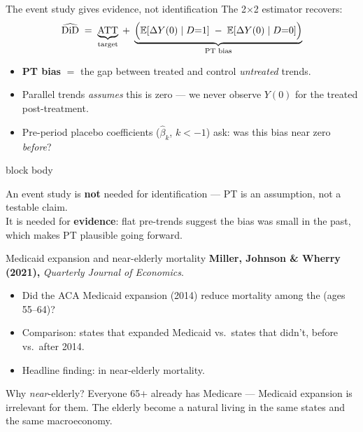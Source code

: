 \documentclass[aspectratio=169,11pt]{beamer}
\newcommand{\emphbox}[1]{%
  \begin{beamercolorbox}[rounded=true,sep=7pt,wd=\linewidth]{block body}%
    \small\color{slate}\raggedright #1%
  \end{beamercolorbox}}
\begin{document}
\begin{frame}{The event study gives evidence, not identification}
\vspace{0.2em}
The 2$\times$2 estimator recovers:
\[
\widehat{\text{DiD}} \;=\; \underbrace{\text{ATT}}_{\text{target}} \;+\;
\underbrace{\Bigl(\mathbb{E}[\Delta Y(0) \mid D{=}1] \;-\; \mathbb{E}[\Delta Y(0) \mid D{=}0]\Bigr)}_{\text{PT bias}}
\]
\vspace{0.1em}
\begin{itemize}\setlength\itemsep{3pt}\small
  \item \textbf{PT bias} $=$ the gap between treated and control \textit{untreated} trends.
  \item Parallel trends \textit{assumes} this is zero --- we never observe $Y(0)$ for the treated post-treatment.
  \item Pre-period placebo coefficients ($\hat\beta_k$, $k < -1$) ask: was this bias near zero \textit{before}?
\end{itemize}
\vspace{0.3em}
\emphbox{An event study is \textbf{not} needed for identification --- PT is an assumption, not a testable claim. \\[4pt]
It is needed for \textbf{evidence}: flat pre-trends suggest the bias was small in the past, which makes PT plausible going forward.}
\end{frame}

\begin{frame}{Medicaid expansion and near-elderly mortality}
\vspace{0.4em}
\textbf{Miller, Johnson \& Wherry (2021),} \textit{Quarterly Journal of Economics}.
\vspace{0.5em}
\begin{itemize}\small\setlength\itemsep{0.4em}
  \item Did the ACA Medicaid expansion (2014) reduce mortality among the  (ages 55--64)?
  \item Comparison: states that expanded Medicaid vs.\ states that didn't, before vs.\ after 2014.
  \item Headline finding:  in near-elderly mortality.
\end{itemize}
\vspace{0.5em}
\begin{block}{Why \textit{near}-elderly?}
\small
Everyone 65$+$ already has Medicare --- Medicaid expansion is irrelevant for them. \;The elderly become a natural  living in the same states and the same macroeconomy.
\end{block}
\vspace{0.3em}
\end{frame}
\end{document}
